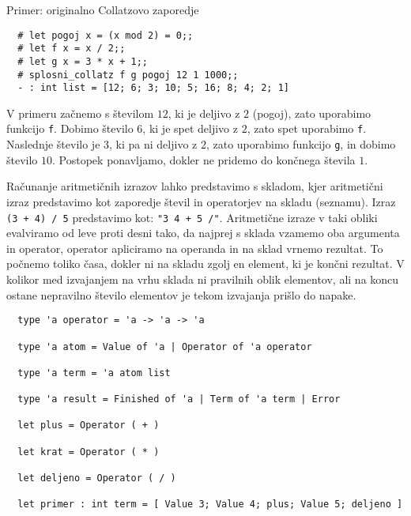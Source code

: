 \documentclass[arhiv]{../izpit}
\begin{document}
  
  Primer: originalno Collatzovo zaporedje
\begin{verbatim}
  # let pogoj x = (x mod 2) = 0;;
  # let f x = x / 2;;
  # let g x = 3 * x + 1;;
  # splosni_collatz f g pogoj 12 1 1000;;
  - : int list = [12; 6; 3; 10; 5; 16; 8; 4; 2; 1]
\end{verbatim}

  V primeru začnemo s številom $12$, ki je deljivo z $2$ (pogoj), zato uporabimo funkcijo \verb|f|.
  Dobimo število $6$, ki je spet deljivo z $2$, zato spet uporabimo \verb|f|.
  Naslednje število je $3$, ki pa ni deljivo z $2$, zato uporabimo funkcijo \verb|g|, in dobimo število $10$.
  Postopek ponavljamo, dokler ne pridemo do končnega števila $1$.


\naloga

Računanje aritmetičnih izrazov lahko predstavimo s skladom, kjer aritmetični izraz predstavimo kot 
zaporedje števil in operatorjev na skladu (seznamu). 
Izraz \verb|(3 + 4) / 5| predstavimo kot: \verb|"3 4 + 5 /"|. 
Aritmetične izraze v taki obliki evalviramo od leve proti desni tako, da najprej s sklada vzamemo 
oba argumenta in operator, operator apliciramo na operanda in na sklad vrnemo rezultat. 
To počnemo toliko časa, dokler ni na skladu zgolj en element, ki je končni rezultat. 
V kolikor med izvajanjem na vrhu sklada ni pravilnih oblik elementov, ali na koncu ostane nepravilno 
število elementov je tekom izvajanja prišlo do napake.  

\begin{verbatim}
  type 'a operator = 'a -> 'a -> 'a

  type 'a atom = Value of 'a | Operator of 'a operator
  
  type 'a term = 'a atom list
  
  type 'a result = Finished of 'a | Term of 'a term | Error
  
  let plus = Operator ( + )
  
  let krat = Operator ( * )
  
  let deljeno = Operator ( / )
  
  let primer : int term = [ Value 3; Value 4; plus; Value 5; deljeno ]    
\end{verbatim}
\end{document}
